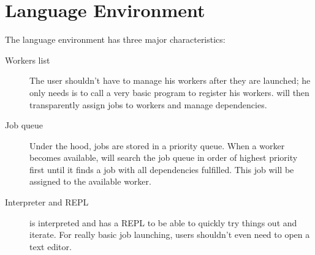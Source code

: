 \section{Language Environment}
\label{sect:tech}
The language environment has three major characteristics:
\begin{description}
\item[Workers list] The user shouldn't have to manage his workers after
they are launched; he only needs is to call a very basic program
to register his workers. \lang{} will then transparently assign jobs to workers
and manage dependencies.
\item[Job queue] Under the hood, jobs are stored in a priority queue. When a
worker becomes available, \lang{} will search the job queue in order of highest
priority first until it finds a job with all dependencies fulfilled. This job
will be assigned to the available worker.
\item[Interpreter and REPL] \lang{} is interpreted and has a REPL to be able to
quickly try things out and iterate. For really basic job launching, users shouldn't
even need to open a text editor.
\end{description}
